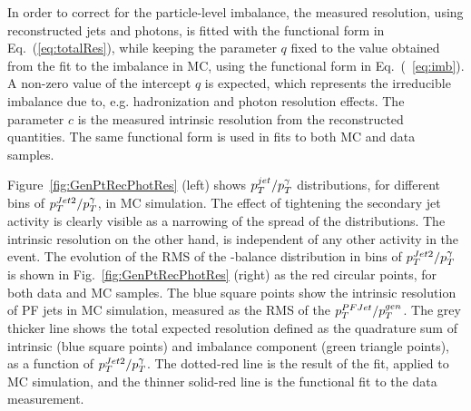 In order to correct for the particle-level imbalance, the measured \pt resolution, using reconstructed jets and photons, is fitted with the functional form in Eq.~(\ref{eq:totalRes}), while keeping the parameter $q$ fixed to the value obtained from the fit to the imbalance in MC, using the functional form in Eq.~(~\ref{eq:imb}). A non-zero value of the intercept $q$ is expected, which represents the irreducible imbalance due to, e.g. hadronization and photon resolution effects. The parameter $c$ is the measured intrinsic resolution from the reconstructed quantities. The same functional form is used in fits to both MC and data samples.

Figure~\ref{fig:GenPtRecPhotRes} (left) shows $p_{{T}}^{jet}/p_{{T}}^{\gamma}$ distributions, for different bins of $p_{{T}}^{Jet2}/p_{{T}}^{\gamma}$, in MC simulation. The effect of tightening the secondary jet activity is clearly visible as a narrowing of the spread of the  distributions. The intrinsic resolution on the other hand, is independent of any other activity in the event. The evolution of the 
RMS of the \pt-balance distribution in bins of $p_{{T}}^{Jet2}/p_{{T}}^{\gamma}$ is shown in Fig.~\ref{fig:GenPtRecPhotRes} (right) as the red circular points, for both data and MC samples. The blue square points show the intrinsic resolution of PF  jets in MC simulation, measured as the RMS of the $p_{{T}}^{PFJet}/p_{{T}}^{gen}$. The grey thicker line shows the total expected resolution defined as the quadrature sum of intrinsic (blue square points) and imbalance component (green triangle points), as a function of $p_{{T}}^{Jet2}/p_{{T}}^{\gamma}$. The dotted-red line is the result of the fit, applied to MC simulation, and the thinner solid-red line is the functional fit to the data measurement.

